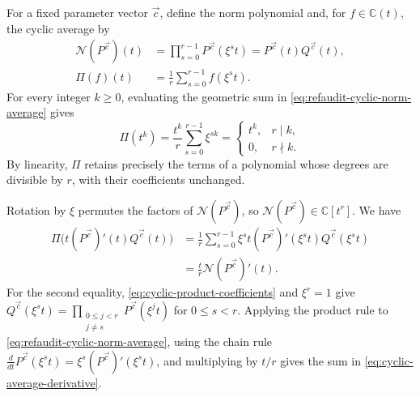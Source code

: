 \documentclass[12pt,reqno,a4paper]{amsart}
\numberwithin{equation}{section}
\numberwithin{figure}{section}
\theoremstyle{plain}
\theoremstyle{definition}
\begin{document}
For a fixed parameter vector $\vec c$, define the norm polynomial
and, for $f\in\mathbb C(t)$, the cyclic average by
\begin{equation}\label{eq:refaudit-cyclic-norm-average}
 \begin{aligned}
 \mathscr N(P^{\vec c})(t)
   &=\prod_{s=0}^{r-1}P^{\vec c}(\xi^st)
     =P^{\vec c}(t)Q^{\vec c}(t),\\
 \Pi(f)(t)&=\frac1r\sum_{s=0}^{r-1}f(\xi^st).
 \end{aligned}
\end{equation}
For every integer $k\geq0$, evaluating the geometric sum in
\eqref{eq:refaudit-cyclic-norm-average} gives
\begin{equation}\label{eq:cyclic-average-monomials}
 \Pi(t^k)=\frac{t^k}{r}\sum_{s=0}^{r-1}\xi^{sk}
 =\begin{cases}
 t^k,&r\mid k,\\
 0,&r\nmid k.
 \end{cases}
\end{equation}
By linearity, $\Pi$ retains precisely the terms of a polynomial
whose degrees are divisible by $r$, with their coefficients unchanged.

Rotation by $\xi$
permutes the factors of $\mathscr N(P^{\vec c})$, so
$\mathscr N(P^{\vec c})\in\mathbb C[t^r]$.
We have
\begin{equation}\label{eq:cyclic-average-derivative}
 \begin{aligned}
 \Pi\bigl(t(P^{\vec c})'(t)Q^{\vec c}(t)\bigr)
 &=\frac1r\sum_{s=0}^{r-1}
       \xi^st(P^{\vec c})'(\xi^st)Q^{\vec c}(\xi^st)\\
 &=\frac{t}{r}\mathscr N(P^{\vec c})'(t).
 \end{aligned}
\end{equation}
For the second equality, \eqref{eq:cyclic-product-coefficients} and
$\xi^r=1$ give
$Q^{\vec c}(\xi^st)=\prod_{\substack{0\leq j<r\\j\ne s}}P^{\vec c}(\xi^jt)$
for $0\leq s<r$.
Applying the product rule to \eqref{eq:refaudit-cyclic-norm-average},
using the chain rule
$\frac{d}{dt}P^{\vec c}(\xi^st)=\xi^s(P^{\vec c})'(\xi^st)$,
and multiplying by $t/r$ gives the sum in
\eqref{eq:cyclic-average-derivative}.
\end{document}
